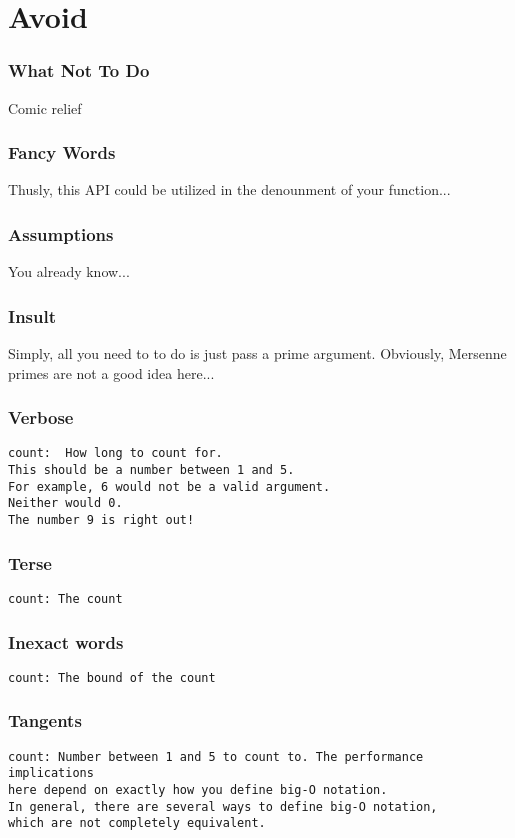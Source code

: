 \section{Avoid}

\begin{frame}
\frametitle{What Not To Do}

Comic relief
\end{frame}

\begin{frame}
\frametitle{Fancy Words}

Thusly, this API could be utilized in the denounment of your function...
\end{frame}

\begin{frame}
\frametitle{Assumptions}

You already know...
\end{frame}

\begin{frame}
\frametitle{Insult}

Simply, all you need to to do is just pass a prime argument.
Obviously, Mersenne primes are not a good idea here...
\end{frame}

\begin{frame}[fragile]
\frametitle{Verbose}

\begin{lstlisting}
count:  How long to count for.
This should be a number between 1 and 5.
For example, 6 would not be a valid argument.
Neither would 0.
The number 9 is right out!
\end{lstlisting}
\end{frame}

\begin{frame}[fragile]
\frametitle{Terse}

\begin{lstlisting}
count: The count
\end{lstlisting}
\end{frame}

\begin{frame}[fragile]
\frametitle{Inexact words}

\begin{lstlisting}
count: The bound of the count
\end{lstlisting}

\end{frame}

\begin{frame}[fragile]
\frametitle{Tangents}

\begin{lstlisting}
count: Number between 1 and 5 to count to. The performance implications
here depend on exactly how you define big-O notation.
In general, there are several ways to define big-O notation,
which are not completely equivalent.
\end{lstlisting}

\end{frame}

